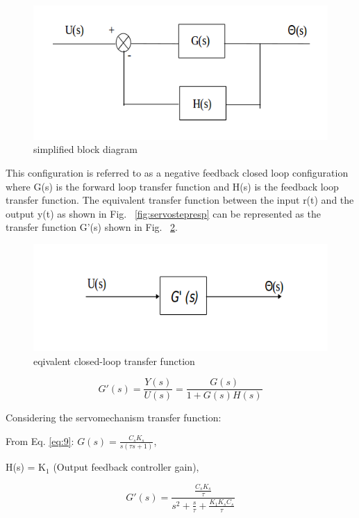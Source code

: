\documentclass[11pt,a4paper]{article}
\begin{document}
\begin{figure}[here]
\includegraphics{imglab/servotfblock.png}
\caption{simplified block diagram}
\label{fig:servotfblock}
\end{figure}

This configuration is referred to as a negative feedback closed loop configuration where G(s) is the forward loop transfer function and H(s) is the feedback loop transfer function. The equivalent transfer function between the input r(t) and the output y(t) as shown in Fig. ~\ref{fig:servostepresp} can be represented as the transfer function G'(s) shown in Fig. ~\ref{fig:servocltfblock}.

\begin{figure}[here]
\includegraphics{imglab/servocltfblock.png}
\caption{eqivalent closed-loop transfer function}
\label{fig:servocltfblock}
\end{figure}

\begin{equation} \label{eq:15}
G'(s)=\frac{Y(s)}{U(s)}=\frac{G(s)}{1+G(s)H(s)}
\end{equation}

Considering the servomechanism transfer function:

From Eq. \ref{eq:9}: $G(s)=\frac{C_{s}K_{s}}{s(\tau s + 1)}$,

H(s) = K$_{1}$ (Output feedback controller gain),

\begin{equation} \label{eq:16}
G'(s)=\frac{\frac{C_{s}K_{s}}{\tau}}{s^{2} + \frac{s}{\tau} + \frac{K_{1}K_{s}C_{s}}{\tau}}
\end{equation}
\end{document}
